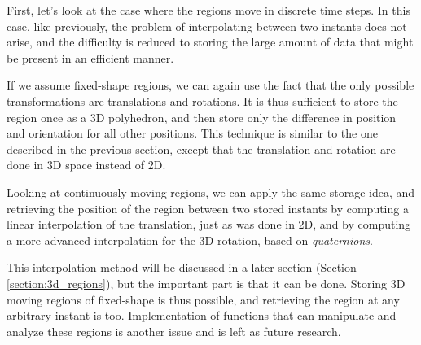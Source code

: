 First, let's look at the case where the regions move in discrete time steps. In this case, like previously, the problem of interpolating between two instants does not arise, and the difficulty is reduced to storing the large amount of data that might be present in an efficient manner. 

If we assume fixed-shape regions, we can again use the fact that the only possible transformations are translations and rotations. It is thus sufficient to store the region once as a 3D polyhedron, and then store only the difference in position and orientation for all other positions. This technique is similar to the one described in the previous section, except that the translation and rotation are done in 3D space instead of 2D.

Looking at continuously moving regions, we can apply the same storage idea, and retrieving the position of the region between two stored instants by computing a linear interpolation of the translation, just as was done in 2D, and by computing a more advanced interpolation for the 3D rotation, based on \textit{quaternions}.

This interpolation method will be discussed in a later section (Section \ref{section:3d_regions}), but the important part is that it can be done. Storing 3D moving regions of fixed-shape is thus possible, and retrieving the region at any arbitrary instant is too. Implementation of functions that can manipulate and analyze these regions is another issue and is left as future research.